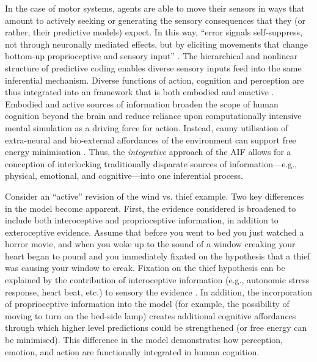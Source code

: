 \begin{CJK}{UTF8}{gbsn}
In the case of motor systems, agents are able to move their sensors in ways that amount to actively seeking or generating the sensory consequences that they (or rather, their predictive models) expect.  In this way, ``error signals self-suppress, not through neuronally mediated effects, but by eliciting movements that change bottom-up proprioceptive and sensory input'' \citep[][1349]{Friston2003}.  The hierarchical and nonlinear structure of predictive coding enables diverse sensory inputs feed into the same inferential mechanism.  Diverse functions of action, cognition and perception are thus integrated into an framework that is both embodied and enactive \citep{Friston2015}.  Embodied and active sources of information broaden the scope of human cognition beyond the brain and reduce reliance upon computationally intensive mental simulation as a driving force for action.  Instead, canny utilisation of extra-neural and bio-external affordances of the environment can support free energy minimisation \citep{Clark2015}.  Thus, the \textit{integrative} approach of the AIF allows for a conception of interlocking traditionally disparate sources of information---e.g., physical, emotional, and cognitive---into one inferential process.

Consider an ``active'' revision of the wind vs. thief example.  Two key differences in the model become apparent.  First, the evidence considered is broadened to include both interoceptive and proprioceptive information, in addition to exteroceptive evidence.  Assume that before you went to bed you just watched a horror movie, and when you woke up to the sound of a window creaking your heart began to pound and you immediately fixated on the hypothesis that a thief was causing your window to creak.  Fixation on the thief hypothesis can be explained by the contribution of interoceptive information (e.g., autonomic stress response, heart beat, etc.) to sensory the evidence \citep{Pezzulo2014}.  In addition, the incorporation of proprioceptive information into the model (for example, the possibility of moving to turn on the bed-side lamp) creates additional cognitive affordances through which higher level predictions could be strengthened (or free energy can be minimised).  This difference in the model demonstrates how perception, emotion, and action are functionally integrated in human cognition.


\end{CJK}
